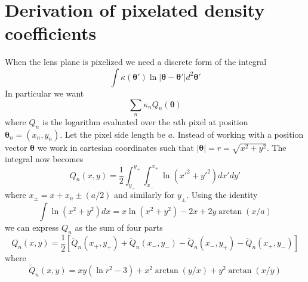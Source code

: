 \documentclass[galley]{mn2e}
\renewcommand{\vec}[1]{\ensuremath{\boldsymbol{#1}}}
\begin{document}
\section{Derivation of pixelated density coefficients}
\label{Q derivation}
When the lens plane is pixelized we need a discrete form of the integral
%
\[\int \kappa(\vec\theta') \ln |\vec\theta-\vec\theta'| d^2\vec\theta' \]
%
In particular we want
%
\[\sum_n \kappa_n Q_n(\vec\theta)\]
%
where $Q_n$ is the logarithm evaluated over the $n$th pixel at position $\vec\theta_n = (x_n, y_n)$. Let the pixel side length be $a$.
Instead of working with a position vector $\vec\theta$ we work in cartesian coordinates such that
%
$|\vec\theta| = r = \sqrt{x^2 + y^2}$. The integral now becomes
%
\[Q_n(x,y) = \frac12 \int_{y_-}^{y_+}\int_{x_-}^{x_+} \ln (x'^2+y'^2) dx' dy'\]
%
where $x_\pm = x + x_n \pm (a/2)$ and similarly for $y_\pm$.
Using the identity
%
\[\int \ln(x^2+y^2) dx = x \ln(x^2+y^2) - 2x + 2y\arctan(x/a) \]
%
we can express $Q_n$ as the sum of four parts
%
\[Q_n(x,y) = \frac12 \left[ \tilde Q_n(x_+,y_+)
        + \tilde Q_n(x_-,y_-)
        - \tilde Q_n(x_-,y_+)
        - \tilde Q_n(x_+,y_-) \right]\]
%
where
%
\[\tilde Q_n(x,y) = xy(\ln r^2 - 3) + x^2\arctan(y/x) + y^2\arctan(x/y)\]



\end{document}
